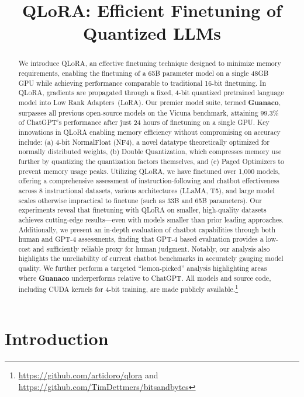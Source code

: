\title{QLoRA: Efficient Finetuning of Quantized LLMs}

\begin{abstract}
We introduce \textsc{QLoRA}, an effective finetuning technique designed to minimize memory requirements, enabling the finetuning of a 65B parameter model on a single 48GB GPU while achieving performance comparable to traditional 16-bit finetuning. In \textsc{QLoRA}, gradients are propagated through a fixed, 4-bit quantized pretrained language model into Low Rank Adapters~(LoRA). Our premier model suite, termed \textbf{Guanaco}, surpasses all previous open-source models on the Vicuna benchmark, attaining 99.3\% of ChatGPT’s performance after just 24 hours of finetuning on a single GPU. Key innovations in \textsc{QLoRA} enabling memory efficiency without compromising on accuracy include: (a) 4-bit NormalFloat (NF4), a novel datatype theoretically optimized for normally distributed weights, (b) Double Quantization, which compresses memory use further by quantizing the quantization factors themselves, and (c) Paged Optimizers to prevent memory usage peaks. Utilizing \textsc{QLoRA}, we have finetuned over 1,000 models, offering a comprehensive assessment of instruction-following and chatbot effectiveness across 8 instructional datasets, various architectures (LLaMA, T5), and large model scales otherwise impractical to finetune (such as 33B and 65B parameters). Our experiments reveal that finetuning with QLoRA on smaller, high-quality datasets achieves cutting-edge results—even with models smaller than prior leading approaches. Additionally, we present an in-depth evaluation of chatbot capabilities through both human and GPT-4 assessments, finding that GPT-4 based evaluation provides a low-cost and sufficiently reliable proxy for human judgment. Notably, our analysis also highlights the unreliability of current chatbot benchmarks in accurately gauging model quality. We further perform a targeted “lemon-picked” analysis highlighting areas where \textbf{Guanaco} underperforms relative to ChatGPT. All models and source code, including CUDA kernels for 4-bit training, are made publicly available.\footnote{\url{https://github.com/artidoro/qlora} and \url{https://github.com/TimDettmers/bitsandbytes}}
\end{abstract}

\section{Introduction}

